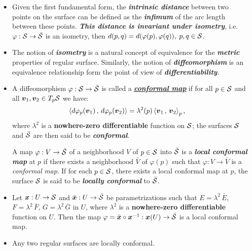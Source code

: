 \documentclass[11pt]{article}
\begin{document}
\begin{itemize}
\item 
Given the first fundamental form, the \emph{\textbf{intrinsic distance}} between two points on the surface can be defined as the \emph{\textbf{infimum}} of the arc length between these points. \textbf{\emph{This distance is invariant under isometry}}, i.e. $\varphi: {\mathcal S} \rightarrow \bar{{\mathcal S}}$ is an isometry, then $d(p,q) = d(\varphi(p), \varphi(q)),\; p,q\in {\mathcal S}$.

\item The notion of \textbf{\emph{isometry}} is a natural concept of equivalence for the \textbf{\emph{metric}} properties of regular surface. Similarly, the notion of \textbf{\emph{diffeomorphism}} is an equivalence relationship form the point of view of \emph{\textbf{differentiability}}. 

\item  \begin{definition}
A diffeomorphism $\varphi: {\mathcal S} \rightarrow \bar{{\mathcal S}}$ is called a \underline{\emph{\textbf{conformal map}}} if for all $p\in {\mathcal S}$ and all $\boldsymbol{v}_1, \boldsymbol{v}_2 \in T_{p}{\mathcal S}$ we have:
\begin{align}
\left\langle d\varphi_{p}(\boldsymbol{v}_1)\,,\, d\varphi_{p}(\boldsymbol{v}_2) \right\rangle &= \lambda^2(p)\left\langle \boldsymbol{v}_1\,,\, \boldsymbol{v}_2 \right\rangle_{p}, \label{eqn: conformal_map}
\end{align} where $\lambda^2$ is a \textbf{nowhere-zero differentiable} function on ${\mathcal S}$; the surfaces ${\mathcal S}$ and $\bar{{\mathcal S}}$ are then said to be \emph{\textbf{conformal}}. 

A map $\varphi: V \rightarrow \bar{{\mathcal S}}$ of a neighborhood $V$ of $p\in {\mathcal S}$ into $\bar{{\mathcal S}}$ is a \emph{\textbf{local conformal map}} at $p$ if there exists a neighborhood $\bar{V}$ of $\varphi(p)$ such that $\varphi: V \rightarrow \bar{V}$ is a \emph{conformal map}. If for each $p\in {\mathcal S}$, there exists a local conformal map at $p$, the surface ${\mathcal S}$ is said to be \emph{\textbf{locally conformal}} to $\bar{{\mathcal S}}$.
\end{definition}

\item \begin{proposition}
Let $\boldsymbol{x}: U \rightarrow {\mathcal S}$ and $\bar{\boldsymbol{x}}: U \rightarrow \bar{{\mathcal S}}$ be parametrizations such that $E = \lambda^2\,\bar{E}$, $F = \lambda^2\,\bar{F}$, $G = \lambda^2\,\bar{G}$ in $U$, where $\lambda^2$ is a \textbf{nowhere-zero differentiable} function on $U$. Then the map $\varphi= \bar{\boldsymbol{x}}\circ \boldsymbol{x}^{-1}:  \boldsymbol{x}(U) \rightarrow \bar{{\mathcal S}}$ is a local conformal map.
\end{proposition}

\item \begin{theorem}
Any two regular surfaces are locally conformal.
\end{theorem}
\end{itemize}
\end{document}
